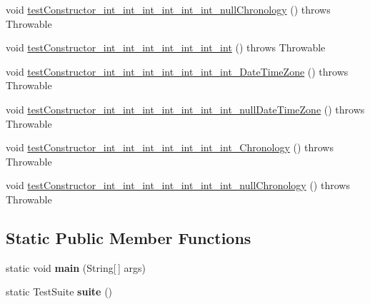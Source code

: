 \begin{DoxyCompactItemize}
\item 
void \hyperlink{classorg_1_1joda_1_1time_1_1_test_date_time___constructors_a32ac9fd177f7d1c47c6f783839a7795f}{test\-Constructor\-\_\-int\-\_\-int\-\_\-int\-\_\-int\-\_\-int\-\_\-int\-\_\-null\-Chronology} ()  throws Throwable 
\item 
void \hyperlink{classorg_1_1joda_1_1time_1_1_test_date_time___constructors_a60152f3c249f483b7b1aee750f082034}{test\-Constructor\-\_\-int\-\_\-int\-\_\-int\-\_\-int\-\_\-int\-\_\-int\-\_\-int} ()  throws Throwable 
\item 
void \hyperlink{classorg_1_1joda_1_1time_1_1_test_date_time___constructors_aa5324b5bfa76131db95b2975c1861fe0}{test\-Constructor\-\_\-int\-\_\-int\-\_\-int\-\_\-int\-\_\-int\-\_\-int\-\_\-int\-\_\-\-Date\-Time\-Zone} ()  throws Throwable 
\item 
void \hyperlink{classorg_1_1joda_1_1time_1_1_test_date_time___constructors_a51c8283b8e7ba12ec88117ff173eb579}{test\-Constructor\-\_\-int\-\_\-int\-\_\-int\-\_\-int\-\_\-int\-\_\-int\-\_\-int\-\_\-null\-Date\-Time\-Zone} ()  throws Throwable 
\item 
void \hyperlink{classorg_1_1joda_1_1time_1_1_test_date_time___constructors_aa98c7f1323dda93dc4dcbbcf065495d1}{test\-Constructor\-\_\-int\-\_\-int\-\_\-int\-\_\-int\-\_\-int\-\_\-int\-\_\-int\-\_\-\-Chronology} ()  throws Throwable 
\item 
void \hyperlink{classorg_1_1joda_1_1time_1_1_test_date_time___constructors_af670a49b510f0648a58f796ff69b91e3}{test\-Constructor\-\_\-int\-\_\-int\-\_\-int\-\_\-int\-\_\-int\-\_\-int\-\_\-int\-\_\-null\-Chronology} ()  throws Throwable 
\end{DoxyCompactItemize}
\subsection*{Static Public Member Functions}
\begin{DoxyCompactItemize}
\item 
\hypertarget{classorg_1_1joda_1_1time_1_1_test_date_time___constructors_a5e26ff54d2c12ade04db28b087c5c790}{static void {\bfseries main} (String\mbox{[}$\,$\mbox{]} args)}\label{classorg_1_1joda_1_1time_1_1_test_date_time___constructors_a5e26ff54d2c12ade04db28b087c5c790}

\item 
\hypertarget{classorg_1_1joda_1_1time_1_1_test_date_time___constructors_aa6c744b648f1518f489956a29b850472}{static Test\-Suite {\bfseries suite} ()}\label{classorg_1_1joda_1_1time_1_1_test_date_time___constructors_aa6c744b648f1518f489956a29b850472}

\end{DoxyCompactItemize}
